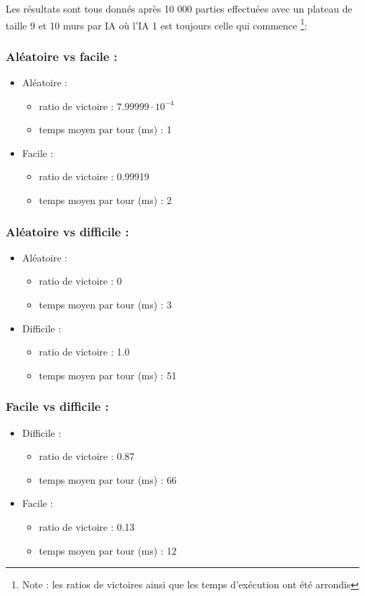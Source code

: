 \documentclass[a4paper, 12pt]{article}
\begin{document}
Les résultats sont tous donnés après 10 000 parties effectuées avec un plateau de taille 9 et 10 murs par IA où l'IA 1 est toujours celle qui commence \footnote{Note : les ratios de victoires ainsi que les temps d'exécution ont été arrondis}:

\subsubsection{Aléatoire vs facile :}
\begin{itemize}
\item[1)] Aléatoire : 
\begin{itemize}
\item[-] ratio de victoire : $7.99999 \cdot 10^{-4}$
\item[-] temps moyen par tour (ms) : 1
\end{itemize}
\item[2)] Facile : 
\begin{itemize}
\item[-] ratio de victoire : 0.99919
\item[-] temps moyen par tour (ms) : 2
\end{itemize}
\end{itemize}

\subsubsection{Aléatoire vs difficile :}
\begin{itemize}
\item[1)] Aléatoire : 
\begin{itemize}
\item[-] ratio de victoire : 0
\item[-] temps moyen par tour (ms) : 3
\end{itemize}
\item[2)] Difficile : 
\begin{itemize}
\item[-] ratio de victoire : 1.0
\item[-] temps moyen par tour (ms) : 51
\end{itemize}
\end{itemize}

\subsubsection{Facile vs difficile :}
\begin{itemize}
\item[1)] Difficile : 
\begin{itemize}
\item[-] ratio de victoire : 0.87
\item[-] temps moyen par tour (ms) : 66
\end{itemize}
\item[2)] Facile : 
\begin{itemize}
\item[-] ratio de victoire : 0.13
\item[-] temps moyen par tour (ms) : 12
\end{itemize}
\end{itemize}
\end{document}
